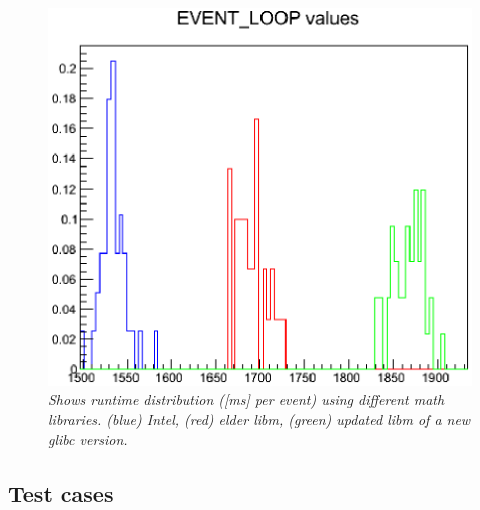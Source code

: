 \documentclass[a4paper]{jpconf}
\begin{document}
\begin{figure}[t]
\begin{minipage}[t]{0.29\textwidth}
\includegraphics[scale=0.40]{figures/brunel_basic_libm.eps}
\caption{\small \textit{Shows runtime distribution ([ms] per event) using different math libraries. (blue) Intel, (red) elder libm, (green) updated libm of a new glibc version.}}
\label{fig:brunel_basic_libm}
\end{minipage}
\end{figure}

\subsection{Test cases}
\label{sec:test_cases}
\end{document}

